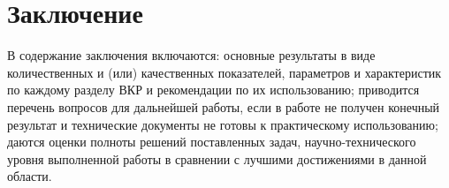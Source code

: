 \section*{\centering Заключение}

В содержание заключения включаются: основные результаты в виде количественных и (или) качественных показателей, параметров и характеристик по каждому разделу ВКР и рекомендации по их использованию; приводится перечень вопросов для дальнейшей работы, если в работе не получен конечный результат и технические документы не готовы к практическому использованию; даются оценки полноты решений поставленных задач, научно-технического уровня выполненной работы в сравнении с лучшими достижениями в данной области.
